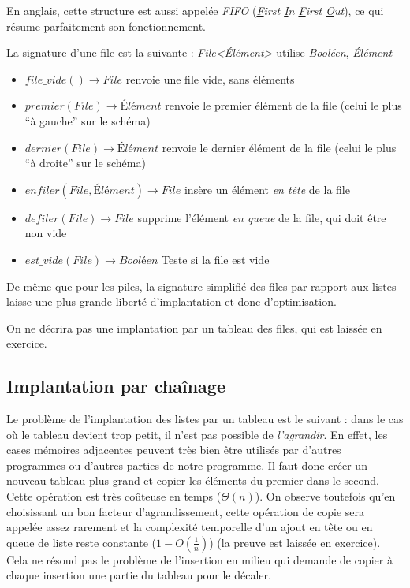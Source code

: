 \documentclass[../../../main.tex]{subfiles}
\begin{document}
En anglais, cette structure est aussi appelée \textit{FIFO} (\textit{\underline{F}irst \underline{I}n \underline{F}irst \underline{O}ut}), ce qui résume parfaitement son fonctionnement.

La signature d'une file est la suivante :\newline
\textit{File\textless Élément\textgreater} utilise \textit{Booléen}, \textit{Élément}
\begin{itemize}
	\item $file\_vide()\rightarrow File$ renvoie une file vide, sans éléments
	\item $premier(File)\rightarrow \textit{Élément}$ renvoie le premier élément de la file (celui le plus ``à gauche'' sur le schéma)
	\item $dernier(File)\rightarrow \textit{Élément}$ renvoie le dernier élément de la file (celui le plus ``à droite'' sur le schéma)
	\item $enfiler(File, \textit{Élément}) \rightarrow File$ insère un élément \textit{en tête} de la file
	\item $defiler(File)\rightarrow File$ supprime l'élément \textit{en queue} de la file, qui doit être non vide
	\item $est\_vide(File)\rightarrow \textit{Booléen}$ Teste si la file est vide
\end{itemize}
De même que pour les piles, la signature simplifié des files par rapport aux listes laisse une plus grande liberté d'implantation et donc d'optimisation.

On ne décrira pas une implantation par un tableau des files, qui est laissée en exercice.
\subsection{Implantation par chaînage}
Le problème de l'implantation des listes par un tableau est le suivant : dans le cas où le tableau devient trop petit, il n'est pas possible de \textit{l'agrandir}. En effet, les cases mémoires adjacentes peuvent très bien être utilisés par d'autres programmes ou d'autres parties de notre programme. Il faut donc créer un nouveau tableau plus grand et copier les éléments du premier dans le second. Cette opération est très coûteuse en temps ($\Theta(n)$). On observe toutefois qu'en choisissant un bon facteur d'agrandissement, cette opération de copie sera appelée assez rarement et la complexité temporelle d'un ajout en tête ou en queue de liste reste constante ($1 - O\left(\frac{1}{n}\right)$) (la preuve est laissée en exercice). Cela ne résoud pas le problème de l'insertion en milieu qui demande de copier à chaque insertion une partie du tableau pour le décaler.
\end{document}
